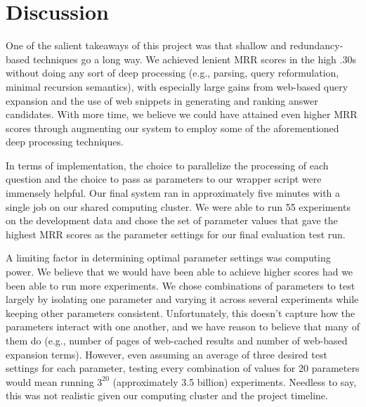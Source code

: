 \documentclass[11pt]{article}
\begin{document}
\section{Discussion}

One of the salient takeaways of this project was that shallow and redundancy-based techniques go a long way. We achieved lenient MRR scores in the high .30s without doing any sort of deep processing (e.g., parsing, query reformulation, minimal recursion semantics), with especially large gains from web-based query expansion and the use of web snippets in generating and ranking answer candidates. With more time, we believe we could have attained even higher MRR scores through augmenting our system to employ some of the aforementioned deep processing techniques.

In terms of implementation, the choice to parallelize the processing of each question and the choice to pass as parameters to our wrapper script were immensely helpful. Our final system ran in approximately five minutes with a single job on our shared computing cluster. We were able to run 55 experiments on the development data and chose the set of parameter values that gave the highest MRR scores as the parameter settings for our final evaluation test run.

A limiting factor in determining optimal parameter settings was computing power. We believe that we would have been able to achieve higher scores had we been able to run more experiments. We chose combinations of parameters to test largely by isolating one parameter and varying it across several experiments while keeping other parameters consistent. Unfortunately, this doesn't capture how the parameters interact with one another, and we have reason to believe that many of them do (e.g., number of pages of web-cached results and number of web-based expansion terms). However, even assuming an average of three desired test settings for each parameter, testing every combination of values for 20 parameters would mean running $3^{20}$ (approximately 3.5 billion) experiments. Needless to say, this was not realistic given our computing cluster and the project timeline.
\end{document}
